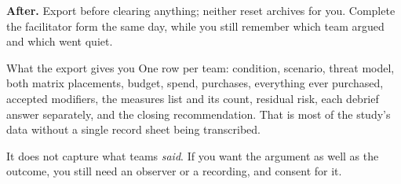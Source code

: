 \textbf{After.} Export before clearing anything; neither reset archives for you.
Complete the facilitator form the same day, while you still remember which team
argued and which went quiet.

\begin{note}{What the export gives you}
One row per team: condition, scenario, threat model, both matrix placements,
budget, spend, purchases, everything ever purchased, accepted modifiers, the
measures list and its count, residual risk, each debrief answer separately, and
the closing recommendation. That is most of the study's data without a single
record sheet being transcribed.

It does not capture what teams \emph{said}. If you want the argument as well as
the outcome, you still need an observer or a recording, and consent for it.
\end{note}
